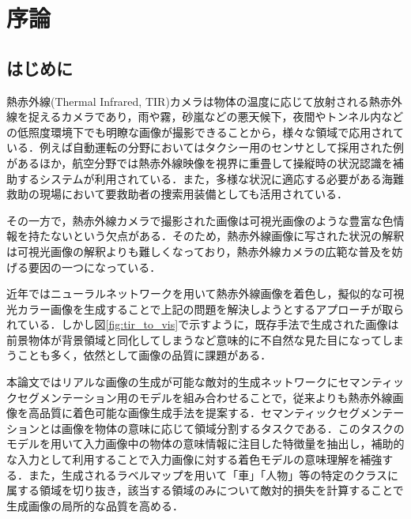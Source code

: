 \documentclass[11pt,dvipdfmx]{ujreport}
\begin{document}
\thispagestyle{empty}



%

\newpage
{}
\tableofcontents
\listoffigures
\listoftables
\pagebreak
{}

\chapter{序論}

\label{sec:introduction}
\section{はじめに}

熱赤外線(Thermal Infrared, TIR)カメラは物体の温度に応じて放射される熱赤外線を捉えるカメラであり，雨や霧，砂嵐などの悪天候下，夜間やトンネル内などの低照度環境下でも明瞭な画像が撮影できることから，様々な領域で応用されている．例えば自動運転の分野においてはタクシー用のセンサとして採用された例\cite{zoox_taxi}があるほか，航空分野では熱赤外線映像を視界に重畳して操縦時の状況認識を補助するシステムが利用されている．また，多様な状況に適応する必要がある海難救助の現場において要救助者の捜索用装備としても活用されている\cite{FLIR_SAR}．\par
その一方で，熱赤外線カメラで撮影された画像は可視光画像のような豊富な色情報を持たないという欠点がある．そのため，熱赤外線画像に写された状況の解釈は可視光画像の解釈よりも難しくなっており，熱赤外線カメラの広範な普及を妨げる要因の一つになっている．

近年ではニューラルネットワークを用いて熱赤外線画像を着色し，擬似的な可視光カラー画像を生成することで上記の問題を解決しようとするアプローチが取られている\cite{KUANG_2020_Infrared_TIC-CGAN, Liao_2023_IEEE_MUGAN, Berg_2018_CVPRW_TIR2Lab}．しかし図\ref{fig:tir_to_vis}で示すように，既存手法で生成された画像は前景物体が背景領域と同化してしまうなど意味的に不自然な見た目になってしまうことも多く，依然として画像の品質に課題がある．\par

本論文ではリアルな画像の生成が可能な敵対的生成ネットワークにセマンティックセグメンテーション用のモデルを組み合わせることで，従来よりも熱赤外線画像を高品質に着色可能な画像生成手法を提案する．セマンティックセグメンテーションとは画像を物体の意味に応じて領域分割するタスクである．このタスクのモデルを用いて入力画像中の物体の意味情報に注目した特徴量を抽出し，補助的な入力として利用することで入力画像に対する着色モデルの意味理解を補強する．また，生成されるラベルマップを用いて「車」「人物」等の特定のクラスに属する領域を切り抜き，該当する領域のみについて敵対的損失を計算することで生成画像の局所的な品質を高める．
\end{document}
